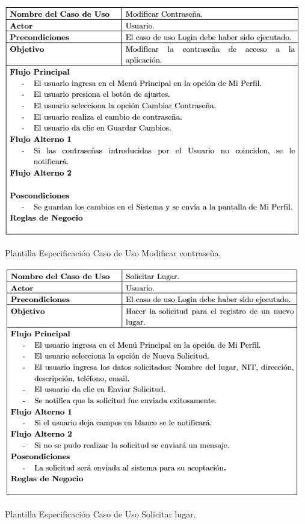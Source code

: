 \documentclass[12pt,letterpaper,openany]{book}
\begin{document}
\begin{table}[H]
\centering
\includegraphics[width=13cm]{./imagenes/PCU/modificar_contrasena}
\caption{Plantilla Especificación Caso de Uso Modificar contraseña.}
\end{table}

\begin{table}[H]
\centering
\includegraphics[width=13cm]{./imagenes/PCU/solicitar_lugar}
\caption{Plantilla Especificación Caso de Uso Solicitar lugar.}
\end{table}
\end{document}
